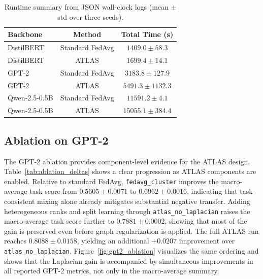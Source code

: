 \documentclass[conference]{IEEEtran}
\begin{document}
\begin{table}[t]
\centering
\caption{Runtime summary from JSON wall-clock logs (mean $\pm$ std over three seeds).}
\label{tab:runtime_summary}
\begin{tabular}{lcc}
\toprule
\textbf{Backbone} & \textbf{Method} & \textbf{Total Time (s)} \\
\midrule
DistilBERT & Standard FedAvg & $1409.0 \pm 58.3$ \\
DistilBERT & ATLAS & $1699.4 \pm 14.1$ \\
\midrule
GPT-2 & Standard FedAvg & $3183.8 \pm 127.9$ \\
GPT-2 & ATLAS & $5491.3 \pm 1132.3$ \\
\midrule
Qwen-2.5-0.5B & Standard FedAvg & $11591.2 \pm 4.1$ \\
Qwen-2.5-0.5B & ATLAS & $15055.1 \pm 384.4$ \\
\bottomrule
\end{tabular}
\end{table}

\subsection{Ablation on GPT-2}

The GPT-2 ablation provides component-level evidence for the ATLAS design. Table~\ref{tab:ablation_deltas} shows a clear progression as ATLAS components are enabled. Relative to standard FedAvg, \texttt{fedavg\_cluster} improves the macro-average task score from $0.5605 \pm 0.0071$ to $0.6962 \pm 0.0016$, indicating that task-consistent mixing alone already mitigates substantial negative transfer. Adding heterogeneous ranks and split learning through \texttt{atlas\_no\_laplacian} raises the macro-average task score further to $0.7881 \pm 0.0002$, showing that most of the gain is preserved even before graph regularization is applied. The full ATLAS run reaches $0.8088 \pm 0.0158$, yielding an additional $+0.0207$ improvement over \texttt{atlas\_no\_laplacian}. Figure~\ref{fig:gpt2_ablation} visualizes the same ordering and shows that the Laplacian gain is accompanied by simultaneous improvements in all reported GPT-2 metrics, not only in the macro-average summary.
\end{document}
